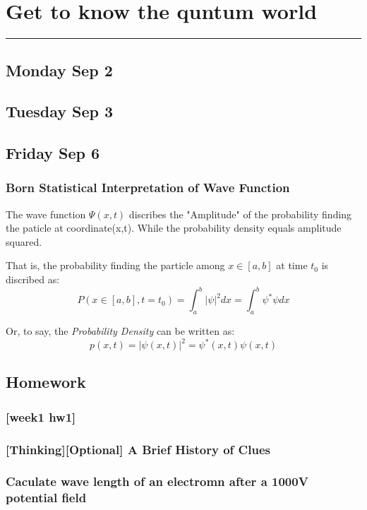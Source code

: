 \section{Get to know the quntum world}
\vspace{-15pt}\noindent\rule{\textwidth}{0.1pt}\vspace{-10pt}
    \subsection{\hfill \small Monday Sep 2}
    \subsection{\hfill\small Tuesday Sep 3}
    \subsection{\hfill \small Friday Sep 6}
    \subsubsection*{Born Statistical Interpretation of Wave Function}
    The wave function $\Psi (x,t)$ discribes the "Amplitude" of the probability finding the paticle at coordinate(x,t). While the probability density equals amplitude squared.

    That is, the probability finding the particle among $x\in [a,b]$ at time $t_0$ is discribed as:
    \begin{equation*}
        P(x\in [a,b],t=t_0)=\int^{b}_{a}|\psi|^{2}dx=\int^{b}_{a}\psi^*\psi dx
    \end{equation*}

    Or, to say, the \textit{Probability Density} can be written as:
    \begin{equation*}
        p(x,t)=|\psi(x,t)|^2=\psi^{*}(x,t)\psi(x,t)
    \end{equation*}
    \subsection*{Homework}
        \subsubsection*{[week1 hw1]}
        \subsubsection{[Thinking][Optional] A Brief History of Clues}
        \subsubsection{Caculate wave length of an electromn after a 1000V potential field}
